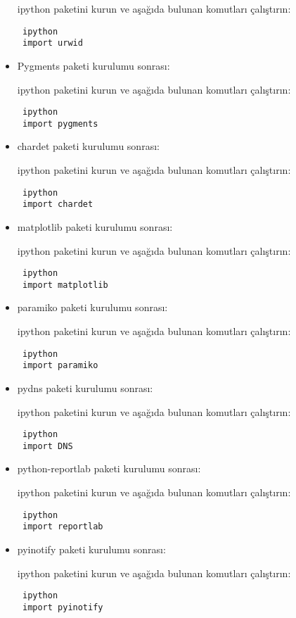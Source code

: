 \documentclass[a4paper,10pt]{article}
\begin{document}
\begin{itemize}
ipython paketini kurun ve aşağıda bulunan komutları çalıştırın:
\begin{verbatim}
 ipython
 import urwid
\end{verbatim}


\item Pygments paketi kurulumu sonrası:

ipython paketini kurun ve aşağıda bulunan komutları çalıştırın:
\begin{verbatim}
 ipython
 import pygments
\end{verbatim}

\item chardet paketi kurulumu sonrası:

ipython paketini kurun ve aşağıda bulunan komutları çalıştırın:
\begin{verbatim}
 ipython
 import chardet
\end{verbatim}

\item matplotlib paketi kurulumu sonrası:

ipython paketini kurun ve aşağıda bulunan komutları çalıştırın:
\begin{verbatim}
 ipython
 import matplotlib
\end{verbatim}

\item paramiko paketi kurulumu sonrası:

ipython paketini kurun ve aşağıda bulunan komutları çalıştırın:
\begin{verbatim}
 ipython
 import paramiko
\end{verbatim}

\item pydns paketi kurulumu sonrası:

ipython paketini kurun ve aşağıda bulunan komutları çalıştırın:
\begin{verbatim}
 ipython
 import DNS
\end{verbatim}


\item python-reportlab paketi kurulumu sonrası:

ipython paketini kurun ve aşağıda bulunan komutları çalıştırın:
\begin{verbatim}
 ipython
 import reportlab
\end{verbatim}

\item pyinotify paketi kurulumu sonrası:

ipython paketini kurun ve aşağıda bulunan komutları çalıştırın:
\begin{verbatim}
 ipython
 import pyinotify
\end{verbatim}


\end{itemize}
\end{document}
